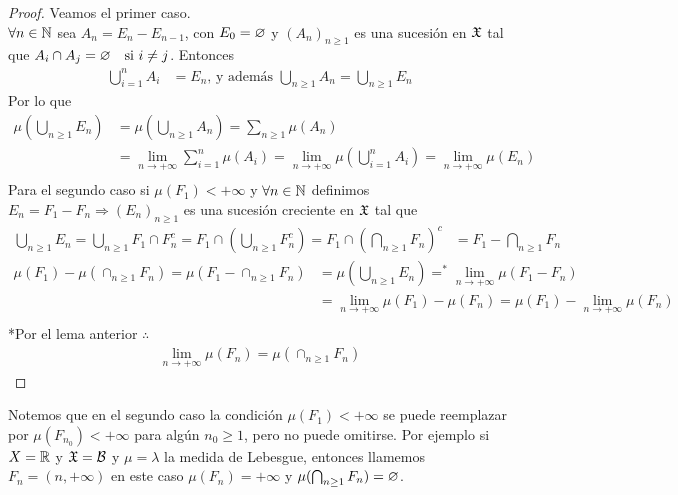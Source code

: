 \begin{lemma}
    \begin{proof}
        Veamos el primer caso. \\
        $\forall n \in \mathbb{N}$ sea $A_n = E_n - E_{n - 1}$, con $E_0 = \varnothing$ y $(A_n)_{n \geq 1}$ es una sucesión en $\mathfrak{X}$ tal que $A_i \cap A_j = \varnothing \quad \text{si } i \neq j$.
        Entonces \begin{align*}
            \bigcup_{i = 1}^n A_i & = E_n \text{, y además } \bigcup_{n \geq 1} A_n = \bigcup_{n \geq 1} E_n
        \end{align*}
        Por lo que \begin{align*}
            \mu(\bigcup_{n \geq 1} E_n) & = \mu(\bigcup_{n \geq 1} A_n) = \sum_{n \geq 1} \mu(A_n)                                                                          \\
                                        & = \lim_{n \to +\infty} \sum_{i = 1}^n \mu(A_i) = \lim_{n \to +\infty} \mu(\bigcup_{i = 1}^n A_i)  = \lim_{n \to +\infty} \mu(E_n) \\
        \end{align*}
        Para el segundo caso si $\mu(F_1) < +\infty$ y $\forall n \in \mathbb{N}$ definimos $E_n = F_1 - F_n \Rightarrow (E_n)_{n \geq 1}$ es una sucesión creciente en $\mathfrak{X}$ tal que \begin{align*}
            \bigcup_{n \geq 1} E_n = \bigcup_{n \geq 1} F_1 \cap F_n^c = F_1 \cap (\bigcup_{n \geq 1} F_n^c) = F_1 \cap (\bigcap_{n \geq 1} F_n)^c & = F_1 - \bigcap_{n \geq 1} F_n
        \end{align*}
        \begin{align*}
            \mu(F_1) - \mu(\cap_{n \geq 1} F_n) = \mu(F_1 - \cap_{n \geq 1} F_n) & = \mu(\bigcup_{n \geq 1} E_n) =^{*} \lim_{n \to +\infty} \mu(F_1 - F_n)               \\
                                                                                 & = \lim_{n \to +\infty} \mu(F_1) - \mu(F_n) = \mu(F_1) - \lim_{n \to +\infty} \mu(F_n) \\
        \end{align*}
        *Por el lema anterior $ \therefore $ \begin{align*}
            \lim_{n \to +\infty} \mu(F_n) = \mu(\cap_{n \geq 1} F_n)
        \end{align*}
    \end{proof}
\end{lemma}

\clearpage

Notemos que en el segundo caso la condición $\mu(F_1) < +\infty$ se puede reemplazar por $\mu(F_{n_0}) < +\infty$ para algún $n_0 \geq 1$, pero no puede omitirse.
Por ejemplo si $X = \mathbb{R}$ y $\mathfrak{X} = \mathcal{B}$ y $\mu = \lambda$ la medida de Lebesgue, entonces llamemos $F_n = (n, +\infty)$ en este caso
$\mu(F_n) = +\infty$ y $\mu(\bigcap_{n \geq 1} F_n) = \varnothing$.


